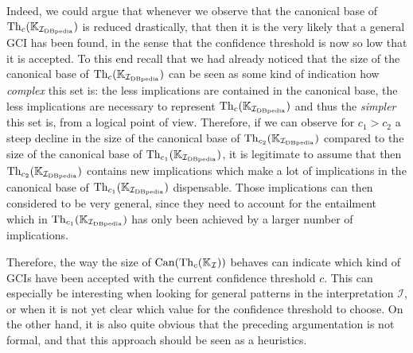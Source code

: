 Indeed, we could argue that whenever we observe that the canonical base of $\operatorname{Th}_c({\mathbb{K}}_{{\mathcal{I}_{\text{DBpedia}}}})$ is reduced drastically, that then it is the very likely that a general GCI
has been found, in the sense that the confidence threshold is now so low that it is
accepted.  To this end recall that we had already noticed that the size of the canonical
base of $\operatorname{Th}_c({\mathbb{K}}_{{\mathcal{I}_{\text{DBpedia}}}})$ can be seen as some kind of indication how
\emph{complex} this set is: the less implications are contained in the canonical base, the
less implications are necessary to represent $\operatorname{Th}_c({\mathbb{K}}_{\mathcal{I}_{\text{DBpedia}}})$ and thus the
\emph{simpler} this set is, from a logical point of view.  Therefore, if we can observe
for $c_1 > c_2$ a steep decline in the size of the canonical base of $\operatorname{Th}_{c_2}({\mathbb{K}}_{{\mathcal{I}_{\text{DBpedia}}}})$ compared to the size of the canonical base of $\operatorname{Th}_{c_1}({\mathbb{K}}_{{\mathcal{I}_{\text{DBpedia}}}})$, it is legitimate to assume that then $\operatorname{Th}_{c_2}({\mathbb{K}}_{{\mathcal{I}_{\text{DBpedia}}}})$
contains new implications which make a lot of implications in the canonical base of
$\operatorname{Th}_{c_1}({\mathbb{K}}_{\mathcal{I}_{\text{DBpedia}}})$ dispensable.  Those implications can then considered to be
very general, since they need to account for the entailment which in $\operatorname{Th}_{c_1}({\mathbb{K}}_{\mathcal{I}_{\text{DBpedia}}})$ has only been achieved by a larger number of implications.

Therefore, the way the size of $\operatorname{Can}(\operatorname{Th}_c({\mathbb{K}}_{\mathcal{I}}))$ behaves can indicate
which kind of GCIs have been accepted with the current confidence threshold $c$.  This can
especially be interesting when looking for general patterns in the interpretation
$\mathcal{I}$, or when it is not yet clear which value for the confidence threshold to
choose.  On the other hand, it is also quite obvious that the preceding argumentation is
not formal, and that this approach should be seen as a heuristics.

